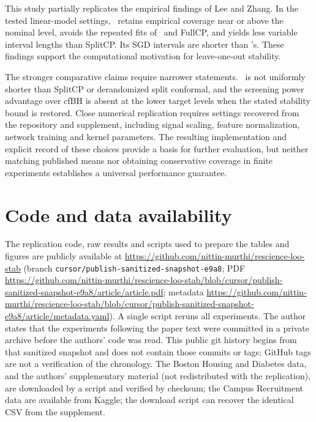 This study partially replicates the empirical findings of Lee and Zhang\supercite{lee2025loo}. In the tested linear-model settings, \LOO\ retains empirical coverage near or above the nominal level, avoids the repeated fits of \RO\ and FullCP, and yields less variable interval lengths than SplitCP. Its SGD intervals are shorter than \RO's. These findings support the computational motivation for leave-one-out stability.

The stronger comparative claims require narrower statements. \LOO\ is not uniformly shorter than SplitCP or derandomized split conformal, and the screening power advantage over cfBH is absent at the lower target levels when the stated stability bound is restored. Close numerical replication requires settings recovered from the repository and supplement, including signal scaling, feature normalization, network training and kernel parameters. The resulting implementation and explicit record of these choices provide a basis for further evaluation, but neither matching published means nor obtaining conservative coverage in finite experiments establishes a universal performance guarantee.

\section*{Code and data availability}

The replication code, raw results and scripts used to prepare the tables and figures are publicly available at
\url{https://github.com/nittin-murthi/rescience-loo-stab} (branch \texttt{cursor/publish-sanitized-snapshot-e9a8};
PDF \url{https://github.com/nittin-murthi/rescience-loo-stab/blob/cursor/publish-sanitized-snapshot-e9a8/article/article.pdf};
metadata \url{https://github.com/nittin-murthi/rescience-loo-stab/blob/cursor/publish-sanitized-snapshot-e9a8/article/metadata.yaml}). A single script reruns all experiments. The author states that the experiments
following the paper text were committed in a private archive before the authors' code was read. This public git history begins from that sanitized snapshot and does not contain those commits or tags; GitHub tags are not a verification of the chronology. The Boston Housing and Diabetes data, and the authors' supplementary material (not redistributed with the replication), are downloaded by a script and verified by checksum; the Campus Recruitment data are available from
Kaggle\supercite{roshan2020placement}; the download script can recover the identical CSV from the supplement.

